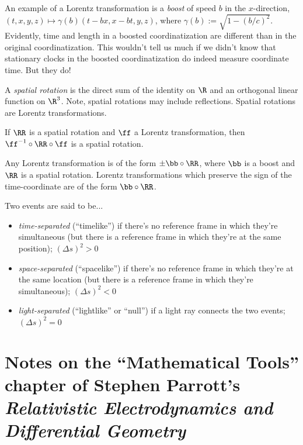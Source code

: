 \vspace{.5cm}

An example of a Lorentz transformation is a \textit{boost} of speed $b$ in the $x$-direction, ${(t, x, y, z) \mapsto \gamma(b)(t - bx, x - bt, y, z)}$, where $\gamma(b) := \sqrt{1 - (b/c)^2}$. Evidently, time and length in a boosted coordinatization are different than in the original coordinatization. This wouldn't tell us much if we didn't know that stationary clocks in the boosted coordinatization do indeed measure coordinate time. But they do!

A \textit{spatial rotation} is the direct sum of the identity on $\R$ and an orthogonal linear function on $\R^3$. Note, spatial rotations may include reflections. Spatial rotations are Lorentz transformations. 

If $\RR$ is a spatial rotation and $\ff$ a Lorentz transformation, then $\ff^{-1} \circ \RR \circ \ff$ is a spatial rotation.

Any Lorentz transformation is of the form $\pm \bb \circ \RR$, where $\bb$ is a boost and $\RR$ is a spatial rotation. Lorentz transformations which preserve the sign of the time-coordinate are of the form $\bb \circ \RR$.

\vspace{.5cm}

Two events are said to be...

\begin{itemize}
	\item \textit{time-separated} (``timelike'') if there's no reference frame in which they're simultaneous (but there is a reference frame in which they're at the same position); $(\Delta s)^2 > 0$
	\item \textit{space-separated} (``spacelike'') if there's no reference frame in which they're at the same location (but there is a reference frame in which they're simultaneous); $(\Delta s)^2 < 0$
	\item \textit{light-separated} (``lightlike'' or ``null'') if a light ray connects the two events; $(\Delta s)^2 = 0$
\end{itemize}

\newpage

\section*{Notes on the ``Mathematical Tools'' chapter of Stephen Parrott's \textit{Relativistic Electrodynamics and Differential Geometry}}


